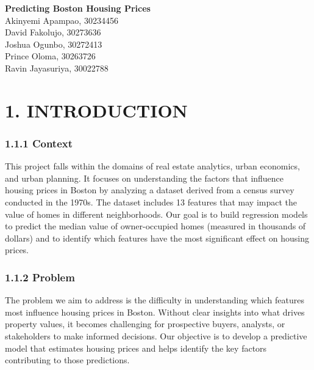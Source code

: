 \documentclass[
]{article}
\author{}
\date{\vspace{-2.5em}}
\begin{document}
\thispagestyle{empty}

\vspace*{5cm}

\begin{center}
    {\LARGE \textbf{Predicting Boston Housing Prices}}\\[1em]
    {\large Akinyemi Apampao, 30234456}\\[1em]
    {\large David Fakolujo, 30273636}\\[1em]
    {\large Joshua Ogunbo, 30272413}\\[1em]
    {\large Prince Oloma, 30263726}\\[1em]
    {\large Ravin Jayasuriya, 30022788}\\
\end{center}

\newpage

\section{1. INTRODUCTION}\label{introduction}

\subsubsection{1.1.1 Context}\label{context}

This project falls within the domains of real estate analytics, urban
economics, and urban planning. It focuses on understanding the factors
that influence housing prices in Boston by analyzing a dataset derived
from a census survey conducted in the 1970s. The dataset includes 13
features that may impact the value of homes in different neighborhoods.
Our goal is to build regression models to predict the median value of
owner-occupied homes (measured in thousands of dollars) and to identify
which features have the most significant effect on housing prices.

\subsubsection{1.1.2 Problem}\label{problem}

The problem we aim to address is the difficulty in understanding which
features most influence housing prices in Boston. Without clear insights
into what drives property values, it becomes challenging for prospective
buyers, analysts, or stakeholders to make informed decisions. Our
objective is to develop a predictive model that estimates housing prices
and helps identify the key factors contributing to those predictions.
\end{document}
